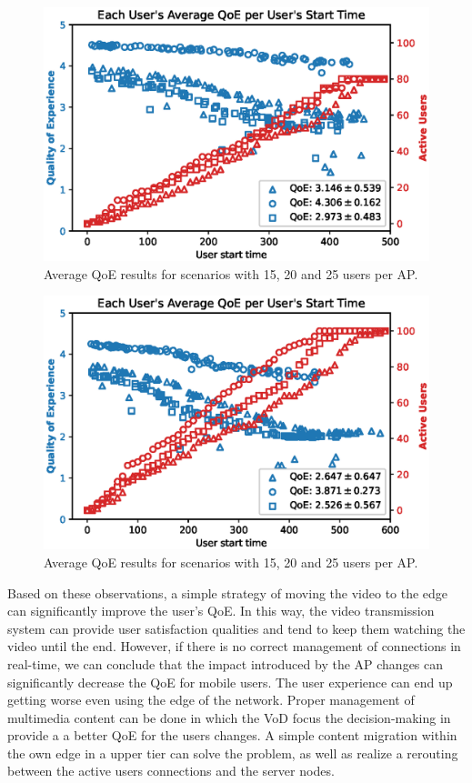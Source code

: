 \begin{figure}[!h]
    \centering
    \includegraphics[width=\linewidth]{images/UserQoExUserStartTime20users.eps}
    \vspace{-0.7cm}
    \caption{Average QoE results for scenarios with 15, 20 and 25 users per AP.}
    \label{fig:exp-setup-scenario}
\end{figure}

\begin{figure}[!h]
    \centering
    \includegraphics[width=\linewidth]{images/UserQoExUserStartTime25users.eps}
    \vspace{-0.7cm}
    \caption{Average QoE results for scenarios with 15, 20 and 25 users per AP.}
    \label{fig:exp-setup-scenario}
\end{figure}

Based on these observations,
a simple strategy of moving the video to the edge can significantly improve the user's QoE. In this way, the video transmission system can provide user satisfaction qualities and tend to keep them watching the video until the end.
However, if there is no correct management of connections in real-time, we can conclude that the impact introduced by the AP changes can significantly decrease the QoE for mobile users. The user experience can end up getting worse even using the edge of the network. Proper management of multimedia content can be done in which the VoD focus the decision-making in provide a a better QoE for the users changes. A simple content migration within the own edge in a upper tier can solve the problem, as well as realize a rerouting between the active users connections and the server nodes. 

